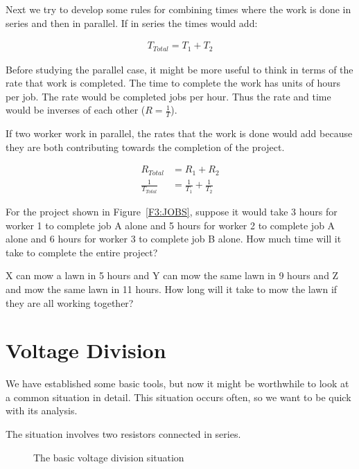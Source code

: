 Next we try to develop some rules for combining times where the work is done in series and then in parallel. If in series the times would add:

\begin{align*}
T_{Total}=T_1+T_2
\end{align*}

Before studying the parallel case, it might be more useful to think in terms of the rate that work is completed. The time to complete the work has units of hours per job. The rate would be completed jobs per hour. Thus the rate and time would be inverses of each other ($R=\frac{1}{T}$).\par
If two worker work in parallel, the rates that the work is done would add because they are both contributing towards the completion of the project.

\begin{align*}
R_{Total}&=R_1+R_2\\
\frac{1}{T_{Total}}&=\frac{1}{T_1}+\frac{1}{T_2}
\end{align*}

\begin{blevel}
For the project shown in Figure~\ref{F3:JOBS}, suppose it would take 3 hours for worker 1 to complete job A alone and 5 hours for worker 2 to complete job A alone and 6 hours for worker 3 to complete job B alone. How much time will it take to complete the entire project?
\end{blevel}

\begin{blevel}
X can mow a lawn in 5 hours and Y can mow the same lawn in 9 hours and Z and mow the same lawn in 11 hours. How long will it take to mow the lawn if they are all working together?
\end{blevel}


\section{Voltage Division}
We have established some basic tools, but now it might be worthwhile to look at a common situation in detail. This situation occurs often, so we want to be quick with its analysis.
\par
The situation involves two resistors connected in series.
\par
\begin{figure}[H]
\begin{center}
\caption{The basic voltage division situation}
\end{center}
\end{figure}

